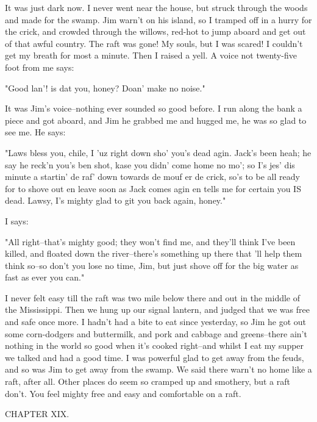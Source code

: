 It was just dark now.  I never went near the house, but struck through
the woods and made for the swamp.  Jim warn't on his island, so I tramped
off in a hurry for the crick, and crowded through the willows, red-hot to
jump aboard and get out of that awful country.  The raft was gone!  My
souls, but I was scared!  I couldn't get my breath for most a minute.
Then I raised a yell.  A voice not twenty-five foot from me says:

"Good lan'! is dat you, honey?  Doan' make no noise."

It was Jim's voice--nothing ever sounded so good before.  I run along the
bank a piece and got aboard, and Jim he grabbed me and hugged me, he was
so glad to see me.  He says:

"Laws bless you, chile, I 'uz right down sho' you's dead agin.  Jack's
been heah; he say he reck'n you's ben shot, kase you didn' come home no
mo'; so I's jes' dis minute a startin' de raf' down towards de mouf er de
crick, so's to be all ready for to shove out en leave soon as Jack comes
agin en tells me for certain you IS dead.  Lawsy, I's mighty glad to git
you back again, honey."

I says:

"All right--that's mighty good; they won't find me, and they'll think
I've been killed, and floated down the river--there's something up there
that 'll help them think so--so don't you lose no time, Jim, but just
shove off for the big water as fast as ever you can."

I never felt easy till the raft was two mile below there and out in the
middle of the Mississippi.  Then we hung up our signal lantern, and
judged that we was free and safe once more.  I hadn't had a bite to eat
since yesterday, so Jim he got out some corn-dodgers and buttermilk, and
pork and cabbage and greens--there ain't nothing in the world so good
when it's cooked right--and whilst I eat my supper we talked and had a
good time.  I was powerful glad to get away from the feuds, and so was
Jim to get away from the swamp.  We said there warn't no home like a
raft, after all.  Other places do seem so cramped up and smothery, but a
raft don't.  You feel mighty free and easy and comfortable on a raft.




CHAPTER XIX.

